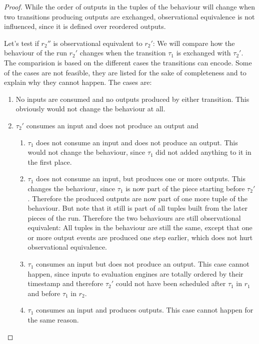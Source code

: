 \begin{proof}
  While the order of outputs in the tuples of the behaviour will change when two transitions producing outputs are exchanged, observational equivalence is not influenced, since it is defined over reordered outputs.

  Let's test if \(r_2''\) is observational equivalent to \(r_2'\):
  We will compare how the behaviour of the run \(r_2'\) changes when the transition \(\tau_1\) is exchanged with \(\tau_2'\).
  The comparision is based on the different cases the transitions can encode.
  Some of the cases are not feasible, they are listed for the sake of completeness and to explain why they cannot happen.
  The cases are:

  \begin{enumerate}
    \item No inputs are consumed and no outputs produced by either transition. This obviously would not change the behaviour at all.
    \item \(\tau_2'\) consumes an input and does not produce an output and
      \begin{enumerate}
        \item \(\tau_1\) does not consume an input and does not produce an output. This would not change the behaviour, since \(\tau_1\) did not added anything to it in the first place.
        \item\label{sec:behaviours:without_timing:greedy:non_greedy_1} \(\tau_1\) does not consume an input, but produces one or more outputs. This changes the behaviour, since \(\tau_1\) is now part of the piece starting before \(\tau_2'\). Therefore the produced outputs are now part of one more tuple of the behaviour. But note that it still is part of all tuples built from the later pieces of the run. Therefore the two behaviours are still observational equivalent: All tuples in the behaviour are still the same, except that one or more output events are produced one step earlier, which does not hurt observational equivalence.
        \item\label{sec:behaviours:without_timing:greedy:impossible_case} \(\tau_1\) consumes an input but does not produce an output. This case cannot happen, since inputs to evaluation engines are totally ordered by their timestamp and therefore \(\tau_2'\) could not have been scheduled after \(\tau_1\) in \(r_1\) and before \(\tau_1\) in \(r_2\).
        \item \(\tau_1\) consumes an input and produces outputs. This case cannot happen for the same reason.
      \end{enumerate}

\end{enumerate}
\end{proof}
